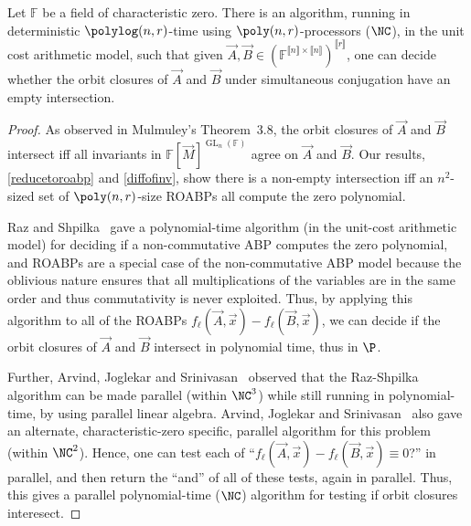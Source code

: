 \documentclass[letterpaper,11pt]{article}
\numberwithin{equation}{section}
\theoremstyle{plain}
\theoremstyle{remark}
\newcommand{\zr}[1]{{\llbracket {#1}\rrbracket}}
\DeclareMathOperator{\GL}{GL}
\newcommand{\F}{\mathbb{F}}
\begin{document}
\begin{theorem*}
	Let $\F$ be a field of characteristic zero. There is an algorithm, running in deterministic $\polylog(n,r)$-time using $\poly(n,r)$-processors ($\NC$), in the unit cost arithmetic model, such that given $\vec{A},\vec{B}\in(\F^{\zr{n}\times \zr{n}})^{\zr{r}}$, one can decide whether the orbit closures of $\vec{A}$ and $\vec{B}$ under simultaneous conjugation have an empty intersection.
\end{theorem*}
\begin{proof}
	As observed in Mulmuley's Theorem~3.8, the orbit closures of $\vec{A}$ and $\vec{B}$ intersect iff all invariants in $\F[\vec{M}]^{\GL_n(\F)}$ agree on $\vec{A}$ and $\vec{B}$.  Our results, \autoref{reducetoroabp} and \autoref{diffofinv}, show there is a non-empty intersection iff an $n^2$-sized set of $\poly(n,r)$-size ROABPs all compute the zero polynomial.

	Raz and Shpilka~\cite{RazShpilka05} gave a polynomial-time algorithm (in the unit-cost arithmetic model) for deciding if a non-commutative ABP computes the zero polynomial, and ROABPs are a special case of the non-commutative ABP model because the oblivious nature ensures that all multiplications of the variables are in the same order and thus commutativity is never exploited.  Thus, by applying this algorithm to all of the ROABPs $f_\ell(\vec{A},\vec{x})-f_\ell(\vec{B},\vec{x})$, we can decide if the orbit closures of $\vec{A}$ and $\vec{B}$ intersect in polynomial time, thus in $\P$.

	Further, Arvind, Joglekar and Srinivasan~\cite{ArvindJS09} observed that the Raz-Shpilka~\cite{RazShpilka05} algorithm can be made parallel (within $\NC^3$) while still running in polynomial-time, by using parallel linear algebra.   Arvind, Joglekar and Srinivasan~\cite{ArvindJS09} also gave an alternate, characteristic-zero specific, parallel algorithm for this problem (within $\NC^2$). Hence, one can test each of ``$f_\ell(\vec{A},\vec{x})-f_\ell(\vec{B},\vec{x})\equiv 0$?'' in parallel, and then return the ``and'' of all of these tests, again in parallel.  Thus, this gives a parallel polynomial-time ($\NC$) algorithm for testing if orbit closures interesect.
\end{proof}
\end{document}

